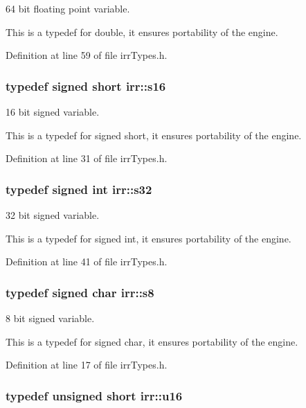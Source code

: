 64 bit floating point variable. 

This is a typedef for double, it ensures portability of the engine. 

Definition at line 59 of file irrTypes.h.\hypertarget{namespaceirr_43ace0af066371ac0862bac3f7314220}{
\subsubsection[{s16}]{\setlength{\rightskip}{0pt plus 5cm}typedef signed short {\bf irr::s16}}}
\label{namespaceirr_43ace0af066371ac0862bac3f7314220}


16 bit signed variable. 

This is a typedef for signed short, it ensures portability of the engine. 

Definition at line 31 of file irrTypes.h.\hypertarget{namespaceirr_c66849b7a6ed16e30ebede579f9b47c6}{
\subsubsection[{s32}]{\setlength{\rightskip}{0pt plus 5cm}typedef signed int {\bf irr::s32}}}
\label{namespaceirr_c66849b7a6ed16e30ebede579f9b47c6}


32 bit signed variable. 

This is a typedef for signed int, it ensures portability of the engine. 

Definition at line 41 of file irrTypes.h.\hypertarget{namespaceirr_dc3ec66d7537550be0fea1c9eeadd63d}{
\subsubsection[{s8}]{\setlength{\rightskip}{0pt plus 5cm}typedef signed char {\bf irr::s8}}}
\label{namespaceirr_dc3ec66d7537550be0fea1c9eeadd63d}


8 bit signed variable. 

This is a typedef for signed char, it ensures portability of the engine. 

Definition at line 17 of file irrTypes.h.\hypertarget{namespaceirr_e9f8ec82692ad3b83c21f555bfa70bcc}{
\subsubsection[{u16}]{\setlength{\rightskip}{0pt plus 5cm}typedef unsigned short {\bf irr::u16}}}
\label{namespaceirr_e9f8ec82692ad3b83c21f555bfa70bcc}


